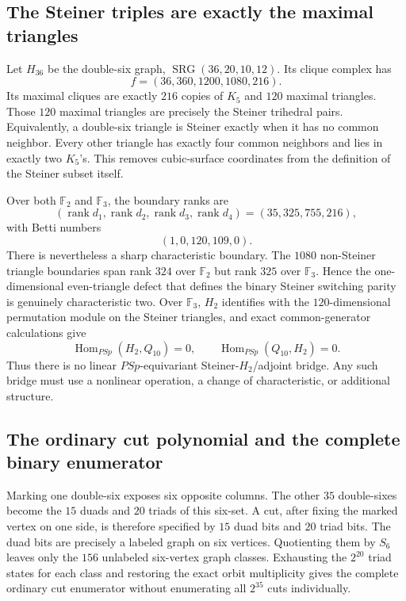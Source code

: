 \subsection{The Steiner triples are exactly the maximal triangles}

Let $H_{36}$ be the double-six graph, $\operatorname{SRG}(36,20,10,12)$.  Its
clique complex has
\[
  f=(36,360,1200,1080,216).
\]
Its maximal cliques are exactly $216$ copies of $K_5$ and $120$ maximal
triangles.  Those $120$ maximal triangles are precisely the Steiner trihedral
pairs.  Equivalently, a double-six triangle is Steiner exactly when it has no
common neighbor.  Every other triangle has exactly four common neighbors and
lies in exactly two $K_5$'s.  This removes cubic-surface coordinates from the
definition of the Steiner subset itself.

Over both $\mathbb F_2$ and $\mathbb F_3$, the boundary ranks are
\[
  (\operatorname{rank}d_1,\operatorname{rank}d_2,
    \operatorname{rank}d_3,\operatorname{rank}d_4)
  =(35,325,755,216),
\]
with Betti numbers
\[
  (1,0,120,109,0).
\]
There is nevertheless a sharp characteristic boundary.  The $1080$
non-Steiner triangle boundaries span rank $324$ over $\mathbb F_2$ but rank
$325$ over $\mathbb F_3$.  Hence the one-dimensional even-triangle defect that
defines the binary Steiner switching parity is genuinely characteristic two.
Over $\mathbb F_3$, $H_2$ identifies with the $120$-dimensional permutation
module on the Steiner triangles, and exact common-generator calculations give
\[
  \operatorname{Hom}_{PSp}(H_2,Q_{10})=0,
  \qquad
  \operatorname{Hom}_{PSp}(Q_{10},H_2)=0.
\]
Thus there is no linear $PSp$-equivariant Steiner-$H_2$/adjoint bridge.  Any
such bridge must use a nonlinear operation, a change of characteristic, or
additional structure.

\subsection{The ordinary cut polynomial and the complete binary enumerator}

Marking one double-six exposes six opposite columns.  The other $35$
double-sixes become the $15$ duads and $20$ triads of this six-set.  A cut,
after fixing the marked vertex on one side, is therefore specified by $15$
duad bits and $20$ triad bits.  The duad bits are precisely a labeled graph on
six vertices.  Quotienting them by $S_6$ leaves only the $156$ unlabeled
six-vertex graph classes.  Exhausting the $2^{20}$ triad states for each class
and restoring the exact orbit multiplicity gives the complete ordinary cut
enumerator without enumerating all $2^{35}$ cuts individually.


